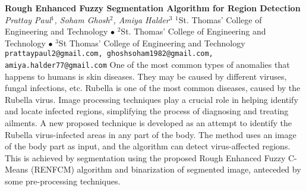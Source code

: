 
    \begin{conf-abstract}[]
        {\textbf{Rough Enhanced Fuzzy Segmentation Algorithm for Region Detection}}
        {\textit{Prattay Paul$^{1}$, Soham Ghosh$^{2}$, Amiya Halder$^{3}$}}
        {$^{1}$St. Thomas' College of Engineering and Technology $\bullet$ $^{2}$St. Thomas' College of Engineering and Technology $\bullet$ $^{3}$St Thomas' College of Engineering and Technology}
        {\texttt{prattaypaul2@gmail.com, ghoshsoham1982@gmail.com, amiya.halder77@gmail.com}}
        {One of the most common types of anomalies that happens to humans is skin diseases. They may be caused by different viruses, fungal infections, etc. Rubella is one of the most common diseases, caused by the Rubella virus. Image processing techniques play a crucial role in helping identify and locate infected regions, simplifying the process of diagnosing and treating ailments. A new proposed technique is developed as an attempt to identify the Rubella virus-infected areas in any part of the body. The method uses an image of the body part as input, and the algorithm can detect virus-affected regions. This is achieved by segmentation using the proposed Rough Enhanced Fuzzy C-Means (RENFCM) algorithm and binarization of segmented image, anteceded by some pre-processing techniques.}
    \end{conf-abstract}
        